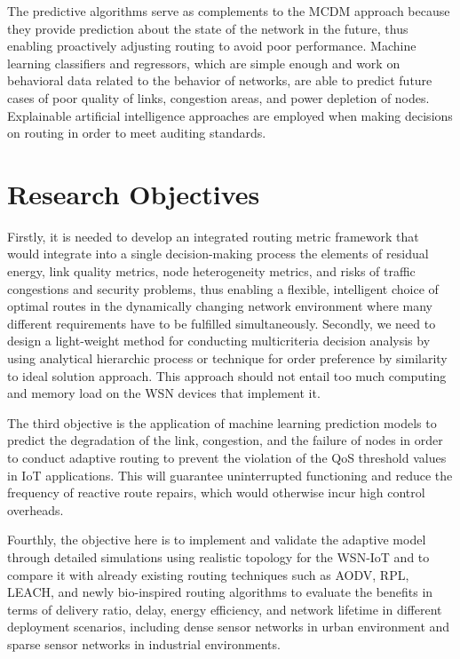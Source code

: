 \documentclass[a4paper,fleqn]{cas-dc}
\numberwithin{equation}{section}
\begin{document}
The predictive algorithms serve as complements to the MCDM approach because they provide prediction about the state of the network in the future, thus enabling proactively adjusting routing to avoid poor performance.
Machine learning classifiers and regressors, which are simple enough and work on behavioral data related to the behavior of networks, are able to predict future cases of poor quality of links, congestion areas, and power depletion of nodes. Explainable artificial intelligence approaches are employed when making decisions on routing in order to meet auditing standards.

\section{Research Objectives}
\label{sec:objectives}

Firstly, it is needed to develop an integrated routing metric framework that would integrate into a single decision-making process the elements of residual energy, link quality metrics, node heterogeneity metrics, and risks of traffic congestions and security problems, thus enabling a flexible, intelligent choice of optimal routes in the dynamically changing network environment where many different requirements have to be fulfilled simultaneously.
Secondly, we need to design a light-weight method for conducting multicriteria decision analysis by using analytical hierarchic process or technique for order preference by similarity to ideal solution approach. This approach should not entail too much computing and memory load on the WSN devices that implement it.\cite{Madhavan2025DesigningSecureIoT,R22_Tiwari2025ChallengesIoTDevices}

The third objective is the application of machine learning prediction models to predict the degradation of the link, congestion, and the failure of nodes in order to conduct adaptive routing to prevent the violation of the QoS threshold values in IoT applications.
This will guarantee uninterrupted functioning and reduce the frequency of reactive route repairs, which would otherwise incur high control overheads.\cite{R9_Tumula2025OptimizingIoTSDNBlockchain, R21_Pessoa2024RITAResilientIoT}

Fourthly, the objective here is to implement and validate the adaptive
model through detailed simulations using realistic topology for the WSN-IoT
and to compare it with already existing routing techniques such as AODV,
RPL, LEACH, and newly bio-inspired routing algorithms to evaluate the
benefits in terms of delivery ratio, delay, energy efficiency, and network
lifetime in different deployment scenarios, including dense sensor networks
in urban environment and sparse sensor networks in industrial environments.
\end{document}
